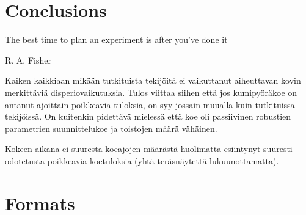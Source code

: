 \documentclass[12pt,a4paper,finnish]{tutthesis}
\begin{document}
\chapter{Conclusions}
\label{ch:concl}

\epigraph{The best time to plan an experiment is after you’ve done it}{R. A. Fisher}


Kaiken kaikkiaan mikään tutkituista tekijöitä ei vaikuttanut aiheuttavan
kovin merkittäviä disperiovaikutuksia. Tulos viittaa siihen että jos kumipyöräkoe
on antanut ajoittain poikkeavia tuloksia, on syy jossain muualla kuin tutkituissa
tekijöissä. On kuitenkin pidettävä mielessä että koe oli passiivinen
robustien parametrien suunnittelukoe ja toistojen määrä vähäinen.




Kokeen aikana ei suuresta koeajojen määrästä huolimatta esiintynyt
suuresti odotetusta poikkeavia koetuloksia (yhtä teräsnäytettä lukuunottamatta).


























\chapter{Formats}
\label{ch:formats}
\end{document}
